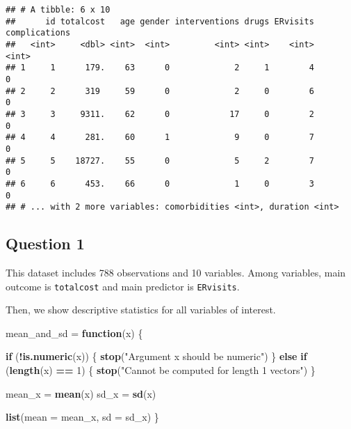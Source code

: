 \documentclass[]{article}
\newenvironment{Shaded}{\begin{snugshade}}{\end{snugshade}}
\newcommand{\KeywordTok}[1]{\textcolor[rgb]{0.13,0.29,0.53}{\textbf{#1}}}
\newcommand{\DataTypeTok}[1]{\textcolor[rgb]{0.13,0.29,0.53}{#1}}
\newcommand{\DecValTok}[1]{\textcolor[rgb]{0.00,0.00,0.81}{#1}}
\newcommand{\StringTok}[1]{\textcolor[rgb]{0.31,0.60,0.02}{#1}}
\newcommand{\ControlFlowTok}[1]{\textcolor[rgb]{0.13,0.29,0.53}{\textbf{#1}}}
\newcommand{\OperatorTok}[1]{\textcolor[rgb]{0.81,0.36,0.00}{\textbf{#1}}}
\newcommand{\NormalTok}[1]{#1}
\begin{document}
\begin{verbatim}
## # A tibble: 6 x 10
##      id totalcost   age gender interventions drugs ERvisits complications
##   <int>     <dbl> <int>  <int>         <int> <int>    <int>         <int>
## 1     1      179.    63      0             2     1        4             0
## 2     2      319     59      0             2     0        6             0
## 3     3     9311.    62      0            17     0        2             0
## 4     4      281.    60      1             9     0        7             0
## 5     5    18727.    55      0             5     2        7             0
## 6     6      453.    66      0             1     0        3             0
## # ... with 2 more variables: comorbidities <int>, duration <int>
\end{verbatim}

\subsection{Question 1}\label{question-1-1}

This dataset includes 788 observations and 10 variables. Among
variables, main outcome is \texttt{totalcost} and main predictor is
\texttt{ERvisits}.

Then, we show descriptive statistics for all variables of interest.

\begin{Shaded}
\begin{Highlighting}[]
\NormalTok{mean_and_sd =}\StringTok{ }\ControlFlowTok{function}\NormalTok{(x) \{}
  
  \ControlFlowTok{if}\NormalTok{ (}\OperatorTok{!}\KeywordTok{is.numeric}\NormalTok{(x)) \{}
    \KeywordTok{stop}\NormalTok{(}\StringTok{"Argument x should be numeric"}\NormalTok{)}
\NormalTok{  \} }\ControlFlowTok{else} \ControlFlowTok{if}\NormalTok{ (}\KeywordTok{length}\NormalTok{(x) }\OperatorTok{==}\StringTok{ }\DecValTok{1}\NormalTok{) \{}
    \KeywordTok{stop}\NormalTok{(}\StringTok{"Cannot be computed for length 1 vectors"}\NormalTok{)}
\NormalTok{  \}}
  
\NormalTok{  mean_x =}\StringTok{ }\KeywordTok{mean}\NormalTok{(x)}
\NormalTok{  sd_x =}\StringTok{ }\KeywordTok{sd}\NormalTok{(x)}

  \KeywordTok{list}\NormalTok{(}\DataTypeTok{mean =}\NormalTok{ mean_x, }
       \DataTypeTok{sd =}\NormalTok{ sd_x)}
\NormalTok{\}}
\end{Highlighting}
\end{Shaded}
\end{document}
